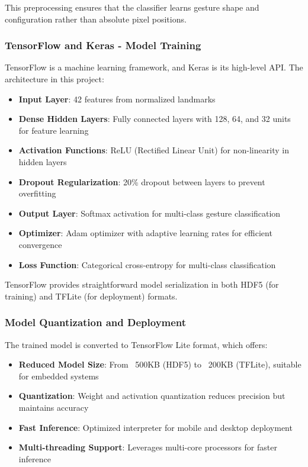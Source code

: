 This preprocessing ensures that the classifier learns gesture shape and configuration rather than absolute pixel positions.

\subsubsection{TensorFlow and Keras - Model Training}

TensorFlow is a machine learning framework, and Keras is its high-level API. The architecture in this project:

\begin{itemize}
    \item \textbf{Input Layer}: 42 features from normalized landmarks
    \item \textbf{Dense Hidden Layers}: Fully connected layers with 128, 64, and 32 units for feature learning
    \item \textbf{Activation Functions}: ReLU (Rectified Linear Unit) for non-linearity in hidden layers
    \item \textbf{Dropout Regularization}: 20\% dropout between layers to prevent overfitting
    \item \textbf{Output Layer}: Softmax activation for multi-class gesture classification
    \item \textbf{Optimizer}: Adam optimizer with adaptive learning rates for efficient convergence
    \item \textbf{Loss Function}: Categorical cross-entropy for multi-class classification
\end{itemize}

TensorFlow provides straightforward model serialization in both HDF5 (for training) and TFLite (for deployment) formats.

\subsubsection{Model Quantization and Deployment}

The trained model is converted to TensorFlow Lite format, which offers:

\begin{itemize}
    \item \textbf{Reduced Model Size}: From ~500KB (HDF5) to ~200KB (TFLite), suitable for embedded systems
    \item \textbf{Quantization}: Weight and activation quantization reduces precision but maintains accuracy
    \item \textbf{Fast Inference}: Optimized interpreter for mobile and desktop deployment
    \item \textbf{Multi-threading Support}: Leverages multi-core processors for faster inference
\end{itemize}

